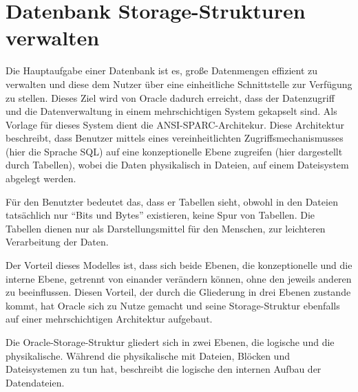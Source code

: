   \chapter{Datenbank Storage-Strukturen verwalten}
    \setcounter{page}{1}
    \minitoc
\newpage
      Die Hauptaufgabe einer Datenbank ist es, gro\ss{}e Datenmengen effizient
      zu verwalten und diese dem Nutzer \"uber eine einheitliche Schnittstelle
      zur Verf\"ugung zu stellen. Dieses Ziel wird von Oracle dadurch erreicht,
      dass der Datenzugriff und die Datenverwaltung in einem mehrschichtigen
      System gekapselt sind. Als Vorlage f\"ur dieses System dient die
      ANSI-SPARC-Architekur.
      Diese Architektur beschreibt, dass Benutzer mittels eines
      vereinheitlichten Zugriffsmechanismusses (hier die Sprache SQL) auf eine
      konzeptionelle Ebene zugreifen (hier dargestellt durch Tabellen), wobei
      die Daten physikalisch in Dateien, auf einem Dateisystem abgelegt werden.

      F\"ur den Benutzter bedeutet das, dass er Tabellen sieht, obwohl in den Dateien tats\"achlich nur \enquote{Bits und Bytes} existieren, keine Spur von Tabellen. Die Tabellen dienen nur als Darstellungsmittel f\"ur den Menschen, zur leichteren Verarbeitung der Daten.

      Der Vorteil dieses Modelles ist, dass sich beide Ebenen, die konzeptionelle und die interne Ebene, getrennt von einander ver\"andern k\"onnen, ohne den jeweils anderen zu beeinflussen. Diesen Vorteil, der durch die Gliederung in drei Ebenen zustande kommt, hat Oracle sich zu Nutze gemacht und seine Storage-Struktur ebenfalls auf einer mehrschichtigen Architektur aufgebaut.

      Die Oracle-Storage-Struktur gliedert sich in zwei Ebenen, die logische und die physikalische. W\"ahrend die physikalische mit Dateien, Bl\"ocken und Dateisystemen zu tun hat, beschreibt die logische den internen Aufbau der Datendateien.

